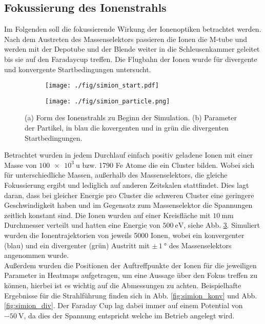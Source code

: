 \subsection{Fokussierung des Ionenstrahls}
\label{sec:fokus1}
Im Folgenden soll die fokussierende Wirkung der Ionenoptiken betrachtet werden.
Nach dem Austreten des Massenselektors passieren die Ionen die M-tube und werden mit der Depotube und der Blende weiter in die Schleusenkammer geleitet bis sie auf den Faradaycup treffen.
Die Flugbahn der Ionen wurde für divergente und konvergente Startbedingungen untersucht.
\begin{figure}
  \centering
  \begin{subfigure}[h]{0.5\textwidth}
    \texttt{[image: ./fig/simion\_start.pdf]}
    \caption{}
    \label{fig:strahlform}
  \end{subfigure}\hfill
  \begin{subfigure}[h]{0.475\textwidth}
    \texttt{[image: ./fig/simion\_particle.png]}
    \caption{}
    \label{fig:strahlparameter}
  \end{subfigure}
  \caption{(a) Form des Ionenstrahls zu Beginn der Simulation. (b) Parameter der Partikel, in blau die kovergenten und in grün die divergenten Startbedingungen.}
  \label{fig:simion_start}
\end{figure}
Betrachtet wurden in jedem Durchlauf einfach positiv geladene Ionen mit einer Masse von $\SI{100e3}{\amu}$ bzw. 1790 Fe Atome die ein Cluster bilden.
Wobei sich für unterschiedliche Massen, außerhalb des Massenselektors, die gleiche Fokussierung ergibt
und lediglich auf anderen Zeitskalen stattfindet.
Dies lagt daran, dass bei gleicher Energie pro Cluster die schweren Cluster eine geringere Geschwindigkeit haben und im Gegensatz zum Massenselektor die Spannungen zeitlich konstant sind.
Die Ionen wurden auf einer Kreisfläche mit $\SI{10}{\mm}$ Durchmesser verteilt und hatten eine Energie von $\SI{500}{\eV}$, siehe Abb. \ref{fig:simion_start}.
Simuliert wurden die Ionentrajektorien von jeweils 5000 Ionen, wobei ein konvergenter (blau) und ein divergenter (grün) Austritt mit $\pm\,\SI{1}{\degree}$ des Massenselektors angenommen wurde.\\

Außerdem wurden die Positionen der Auftreffpunkte der Ionen für die jeweiligen Parameter in Heatmaps aufgetragen, um eine Aussage über den Fokus treffen zu können, hierbei ist es wichtig auf die Abmessungen zu achten.
Beispielhafte Ergebnisse für die Strahlführung finden sich in Abb. \ref{fig:simion_konv} und Abb. \ref{fig:simion_div}.
Der Faraday Cup lag dabei immer auf einem Potential von $\SI{-50}{\volt}$, da dies der Spannung entspricht welche im Betrieb angelegt wird.\\

